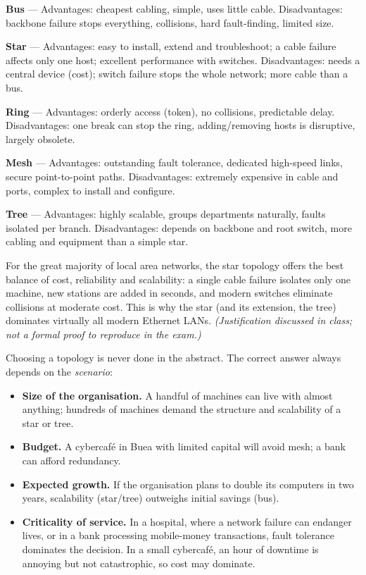 \documentclass[11pt]{article}
\newcommand{\cle}[1]{{\popxbold\color{popdark}#1}}
\newcounter{popsec}
\newcounter{popsub}
\newcommand{\courssub}[1]{%
  \stepcounter{popsub}%
  \par\vspace{9pt}\noindent{\popxbold\fontsize{11.5}{13}\selectfont\color{popink}{\color{poporange}\thepopsec.\thepopsub}\hspace{6pt}#1}\par\nopagebreak\vspace{4pt}
}
\begin{document}
\begin{aretenir}
\textbf{Bus} --- Advantages: cheapest cabling, simple, uses little cable. Disadvantages: backbone failure stops everything, collisions, hard fault-finding, limited size.\par
\textbf{Star} --- Advantages: easy to install, extend and troubleshoot; a cable failure affects only one host; excellent performance with switches. Disadvantages: needs a central device (cost); switch failure stops the whole network; more cable than a bus.\par
\textbf{Ring} --- Advantages: orderly access (token), no collisions, predictable delay. Disadvantages: one break can stop the ring, adding/removing hosts is disruptive, largely obsolete.\par
\textbf{Mesh} --- Advantages: outstanding fault tolerance, dedicated high-speed links, secure point-to-point paths. Disadvantages: extremely expensive in cable and ports, complex to install and configure.\par
\textbf{Tree} --- Advantages: highly scalable, groups departments naturally, faults isolated per branch. Disadvantages: depends on backbone and root switch, more cabling and equipment than a simple star.
\end{aretenir}

\begin{propriete}
For the great majority of local area networks, the \cle{star topology} offers the best balance of cost, reliability and scalability: a single cable failure isolates only one machine, new stations are added in seconds, and modern switches eliminate collisions at moderate cost. This is why the star (and its extension, the tree) dominates virtually all modern Ethernet LANs. \emph{(Justification discussed in class; not a formal proof to reproduce in the exam.)}
\end{propriete}

\courssub{Decision Factors in Context}

Choosing a topology is never done in the abstract. The correct answer always depends on the \emph{scenario}:

\begin{itemize}
\item \textbf{Size of the organisation.} A handful of machines can live with almost anything; hundreds of machines demand the structure and scalability of a star or tree.
\item \textbf{Budget.} A cybercafé in Buea with limited capital will avoid mesh; a bank can afford redundancy.
\item \textbf{Expected growth.} If the organisation plans to double its computers in two years, scalability (star/tree) outweighs initial savings (bus).
\item \textbf{Criticality of service.} In a hospital, where a network failure can endanger lives, or in a bank processing mobile-money transactions, fault tolerance dominates the decision. In a small cybercafé, an hour of downtime is annoying but not catastrophic, so cost may dominate.
\end{itemize}
\end{document}
